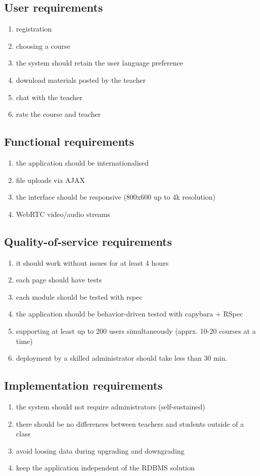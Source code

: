 \subsection{User requirements}
\begin{enumerate}
\item registration
\item choosing a course
\item the system should retain the user language preference
\item download materials posted by the teacher
\item chat with the teacher
\item rate the course and teacher
\end{enumerate}

\subsection{Functional requirements}
\begin{enumerate}
\item the application should be internationalised
\item file uploads via AJAX
\item the interface should be responsive (800x600 up to 4k resolution)
\item WebRTC video/audio streams
\end{enumerate}

\subsection{Quality-of-service requirements}
\begin{enumerate}
\item it should work without issues for at least 4 hours
\item each page should have tests
\item each module should be tested with rspec
\item the application should be behavior-driven tested with capybara + RSpec
\item supporting at least up to 200 users simultaneously (apprx. 10-20 courses
at a time)
\item deployment by a skilled administrator should take less than 30 min.
\end{enumerate}

\subsection{Implementation requirements}
\begin{enumerate}
\item the system should not require administrators (self-sustained)
\item there should be no differences between teachers and students outside of a
class
\item avoid loosing data during upgrading and downgrading
\item keep the application independent of the RDBMS solution
\end{enumerate}

